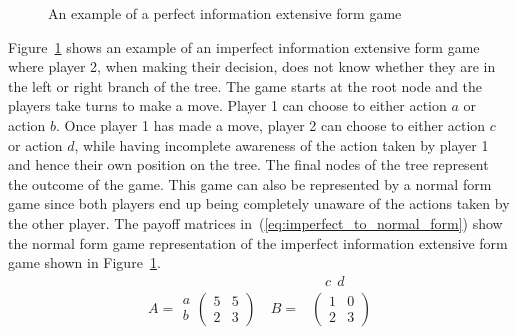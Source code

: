 \begin{figure}[H]
    \centering
    
    \caption{An example of a perfect information extensive form game}
    \label{fig:imperfect_extensive_form_game}
\end{figure}

Figure~\ref{fig:imperfect_extensive_form_game} shows an example of an imperfect
information extensive form game where player 2, when making their decision,
does not know whether they are in the left or right branch of the tree.
The game starts at the root node and the players take turns to make a move.
Player 1 can choose to either action \(a\) or action \(b\).
Once player 1 has made a move, player 2 can choose to either action \(c\) or
action \(d\), while having incomplete awareness of the action taken by player 1
and hence their own position on the tree.
The final nodes of the tree represent the outcome of the game.
This game can also be represented by a normal form game since both players end
up being completely unaware of the actions taken by the other player.
The payoff matrices in~(\ref{eq:imperfect_to_normal_form}) show the normal form
game representation of the imperfect information extensive form game shown in
Figure~\ref{fig:imperfect_extensive_form_game}.
\begin{align}\label{eq:imperfect_to_normal_form}
    & \quad c \ \ d \nonumber \\
    A =
    \begin{matrix}
        a \\
        b
    \end{matrix}
    \begin{pmatrix}
        5 & 5 \\
        2 & 3
    \end{pmatrix} \quad
    B =&
    \begin{pmatrix}
        1 & 0 \\
        2 & 3
    \end{pmatrix}
\end{align}
